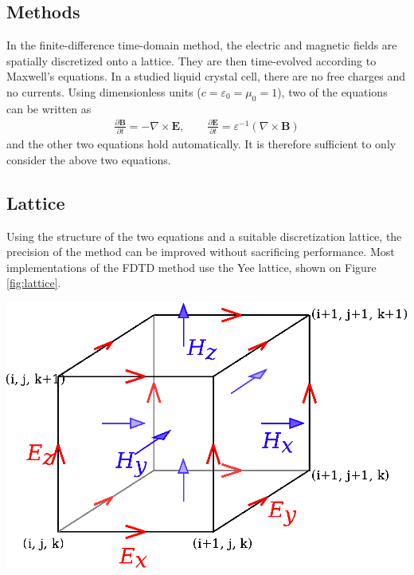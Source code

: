 \documentclass[a4paper,10pt]{article}
\newcommand{\odvod}[2]{\frac{\partial #1}{\partial #2}}
\renewcommand{\vec}{\mathbf}
\newcommand{\eps}{\varepsilon}
\renewenvironment{figure}
  {\par\medskip\noindent\minipage{\linewidth}}
  {\endminipage\par\medskip}
\begin{document}
\begin{multicols}{2}
\section{Methods}
In the finite-difference time-domain method, the electric and magnetic fields are spatially discretized onto a lattice. 
They are then time-evolved according to Maxwell's equations\cite{taflove}. 
In a studied liquid crystal cell, there are no free charges and no currents. 
Using dimensionless units ($c=\varepsilon_0=\mu_0=1$), two of the equations can be written as
\begin{align}
\label{eq:maxwell}
 \odvod{\vec{B}}{t} = -\nabla \times \vec{E}, \qquad \odvod{\vec{E}}{t} = \eps^{-1} (\nabla \times \vec{B})
\end{align}
and the other two equations hold automatically\cite{taflove}. 
It is therefore sufficient to only consider the above two equations. 

\subsection{Lattice}
Using the structure of the two equations and a suitable discretization lattice, the precision of the method can be improved without sacrificing performance. 
Most implementations of the \textsc{FDTD} method use the Yee lattice\cite{yee, taflove, yee-lattice}, shown on Figure \ref{fig:lattice}. 

\begin{figure}
 \centering
 \includegraphics[width=.5\textwidth]{Yee-cube}
\end{figure}
\end{multicols}
\end{document}
